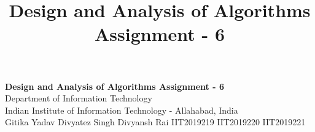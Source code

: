 \documentclass[10pt]{article}
\author{}
\title{\Large{Design and Analysis of Algorithms Assignment - 6}}
\begin{document}
	\begin{center}
		{\Large \textbf{Design and Analysis of Algorithms Assignment - 6}}\\
		\vspace{1em}
		{\large Department of Information Technology}\\
		\vspace{1em}
		\large{Indian Institute of Information Technology - Allahabad, India}\\
		\vspace{1em}
		\large{Gitika Yadav \hspace{10em} Divyatez Singh \hspace{10em} Divyansh  Rai}
		\large{IIT2019219 \hspace{10.5em} IIT2019220 \hspace{10.5em} IIT2019221}
		
		\vspace{2.5em}
	\end{center}
	
\end{document}
